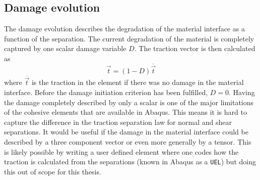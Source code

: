 \documentclass[grain_boundary_law.tex]{subfiles}
\begin{document}
\subsection{Damage evolution}

The damage evolution describes the degradation of the material interface as a function of the separation. The current degradation of the material is completely captured by one scalar damage variable $D$. The traction vector is then calculated as 
%
\[ \vec{t} = (1 - D) \overline{\vec{t}} \]
%
 where $\overline{\vec{t}}$ is the traction in the element if there was no damage in the material interface. Before the damage initiation criterion has been fulfilled, $D = 0$. Having the damage completely described by only a scalar is one of the major limitations of the cohesive elements that are available in Abaqus. This means it is hard to capture the difference in the traction separation law for normal and shear separations. It would be useful if the damage in the material interface could be described by a three component vector or even more generally by a tensor. This is likely possible by writing a user defined element where one codes how the traction is calculated from the separations (known in Abaqus as a \texttt{UEL}) but doing this out of scope for this thesis.
\end{document}
